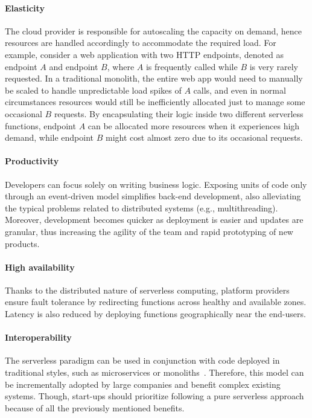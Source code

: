 \paragraph{\textbf{Elasticity}} The cloud provider is responsible for autoscaling the capacity
on demand, hence resources are handled accordingly to accommodate the required load.
For example, consider a web application with two HTTP endpoints, denoted as endpoint $A$ and endpoint $B$,
where $A$ is frequently called while $B$ is very rarely requested.
In a traditional monolith, the entire web app would need to manually be scaled
to handle unpredictable load spikes of $A$ calls, and even in normal circumstances
resources would still be inefficiently allocated just to manage some occasional $B$ requests.
By encapsulating their logic inside two different serverless functions,
endpoint $A$ can be allocated more resources when it experiences high demand,
while endpoint $B$ might cost almost zero due to its occasional requests.

\paragraph{\textbf{Productivity}} Developers can focus solely on writing
business logic. Exposing units of code only through an event-driven model simplifies back-end development,
also alleviating the typical problems related to distributed systems (e.g., multithreading).
Moreover, development becomes quicker as deployment is easier and updates are granular,
thus increasing the agility of the team and rapid prototyping of new products.

\paragraph{\textbf{High availability}} Thanks to the distributed nature of serverless computing,
platform providers ensure fault tolerance by redirecting functions across healthy and available zones.
Latency is also reduced by deploying functions geographically near the end-users.

\paragraph{\textbf{Interoperability}} The serverless paradigm can be used in
conjunction with code deployed in traditional styles,
such as microservices or monoliths~\cite{serverless-wikipedia}.
Therefore, this model can be incrementally adopted by large companies and benefit
complex existing systems. Though, start-ups should prioritize following a pure serverless approach
because of all the previously mentioned benefits.

